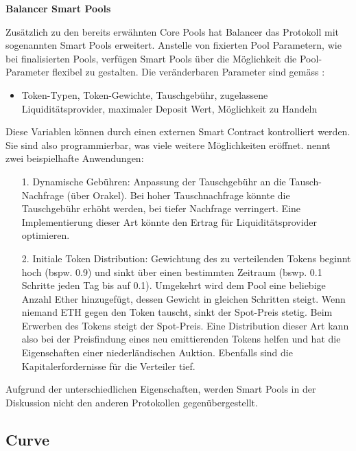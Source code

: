 \documentclass[12pt,a4paper,titlepage,oneside,english]{article}
\begin{document}
\textbf{Balancer Smart Pools}

Zusätzlich zu den bereits erwähnten Core Pools hat Balancer das Protokoll mit sogenannten Smart Pools erweitert. %
Anstelle von fixierten Pool Parametern, wie bei finalisierten Pools, verfügen Smart Pools über die Möglichkeit die Pool-Parameter flexibel zu gestalten.
Die veränderbaren Parameter sind gemäss \citet{Hoffman2020}:
\begin{itemize}
  \item{Token-Typen, Token-Gewichte, Tauschgebühr, zugelassene Liquiditätsprovider, maximaler Deposit Wert, Möglichkeit zu Handeln} %
\end{itemize}
Diese Variablen können durch einen externen Smart Contract kontrolliert werden. Sie sind also programmierbar, was viele weitere Möglichkeiten eröffnet. \citet{Hoffman2020} nennt zwei beispielhafte Anwendungen:
\begin{itemize}
  \item[1.]{Dynamische Gebühren: Anpassung der Tauschgebühr an die Tausch-Nachfrage (über Orakel). Bei hoher Tauschnachfrage könnte die Tauschgebühr erhöht werden, bei tiefer Nachfrage verringert. Eine Implementierung dieser Art könnte den Ertrag für Liquiditätsprovider optimieren.}
  \item[2.]{Initiale Token Distribution: Gewichtung des zu verteilenden Tokens beginnt hoch (bspw. 0.9) und sinkt über einen bestimmten Zeitraum (bswp. 0.1 Schritte jeden Tag bis auf 0.1). Umgekehrt wird dem Pool eine beliebige Anzahl Ether hinzugefügt, dessen Gewicht in gleichen Schritten steigt. Wenn niemand ETH gegen den Token tauscht, sinkt der Spot-Preis stetig. Beim Erwerben des Tokens steigt der Spot-Preis. Eine Distribution dieser Art kann also bei der Preisfindung eines neu emittierenden Tokens helfen und hat die Eigenschaften einer niederländischen Auktion. Ebenfalls sind die Kapitalerfordernisse für die Verteiler tief.}
  \end{itemize}
  
Aufgrund der unterschiedlichen Eigenschaften, werden Smart Pools in der Diskussion nicht den anderen Protokollen gegenübergestellt.\\

\subsection{Curve}
\end{document}
